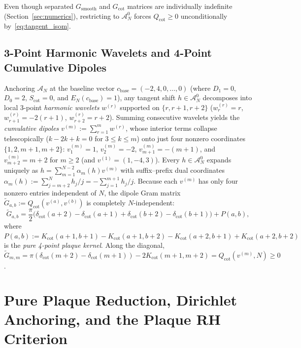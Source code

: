 \documentclass[11pt,a4paper]{article}
\theoremstyle{definition}
\begin{document}
Even though separated $G_{\mathrm{smooth}}$ and $G_{\mathrm{cot}}$ matrices are individually indefinite (Section~\ref{sec:numerics}), restricting to $\mathcal{A}_N^0$ forces $Q_{\mathrm{cot}} \ge 0$ unconditionally by~\eqref{eq:tangent_isom}.

\subsection{3-Point Harmonic Wavelets and 4-Point Cumulative Dipoles}

Anchoring $\mathcal{A}_N$ at the baseline vector $c_{\mathrm{base}} = (-2, 4, 0, \dots, 0)$ (where $D_1 = 0$, $D_0 = 2$, $S_{\mathrm{cot}} = 0$, and $E_N(c_{\mathrm{base}}) = 1$), any tangent shift $h \in \mathcal{A}_N^0$ decomposes into local 3-point \emph{harmonic wavelets} $w^{(r)}$ supported on $\{r, r+1, r+2\}$ ($w^{(r)}_r = r$, $w^{(r)}_{r+1} = -2(r+1)$, $w^{(r)}_{r+2} = r+2$). Summing consecutive wavelets yields the \emph{cumulative dipoles} $v^{(m)} := \sum_{r=1}^m w^{(r)}$, whose interior terms collapse telescopically ($k - 2k + k = 0$ for $3 \le k \le m$) onto just four nonzero coordinates $\{1, 2, m+1, m+2\}$: $v^{(m)}_1 = 1$, $v^{(m)}_2 = -2$, $v^{(m)}_{m+1} = -(m+1)$, and $v^{(m)}_{m+2} = m+2$ for $m \ge 2$ (and $v^{(1)} = (1, -4, 3)$). Every $h \in \mathcal{A}_N^0$ expands uniquely as $h = \sum_{m=1}^{N-2} \alpha_m(h) v^{(m)}$ with suffix--prefix dual coordinates $\alpha_m(h) := \sum_{j=m+2}^N h_j/j = -\sum_{j=1}^{m+1} h_j/j$. Because each $v^{(m)}$ has only four nonzero entries independent of $N$, the dipole Gram matrix $\widetilde{G}_{a,b} := Q_{\mathrm{cot}}(v^{(a)}, v^{(b)})$ is completely $N$-independent:
\begin{equation}\label{eq:dipole_gram_def}
\widetilde{G}_{a,b} = \frac{\pi}{2}\bigl(\delta_{\mathrm{cot}}(a+2)-\delta_{\mathrm{cot}}(a+1)+\delta_{\mathrm{cot}}(b+2)-\delta_{\mathrm{cot}}(b+1)\bigr) + P(a, b),
\end{equation}
where $P(a, b) := K_{\mathrm{cot}}(a+1, b+1) - K_{\mathrm{cot}}(a+1, b+2) - K_{\mathrm{cot}}(a+2, b+1) + K_{\mathrm{cot}}(a+2, b+2)$ is the \emph{pure 4-point plaque kernel}. Along the diagonal, $\widetilde{G}_{m,m} = \pi(\delta_{\mathrm{cot}}(m+2)-\delta_{\mathrm{cot}}(m+1)) - 2 K_{\mathrm{cot}}(m+1,m+2) = Q_{\mathrm{cot}}(v^{(m)}, N) \ge 0$.

\section{Pure Plaque Reduction, Dirichlet Anchoring, and the Plaque RH Criterion}\label{sec:plaque}
\end{document}
